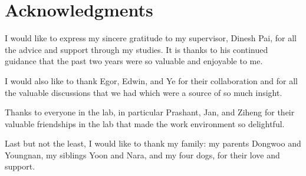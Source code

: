 
\chapter{Acknowledgments}

I would like to express my sincere gratitude to my supervisor, Dinesh Pai, for all the advice and support through my studies.
It is thanks to his continued guidance that the past two years were so valuable and enjoyable to me.

I would also like to thank Egor, Edwin, and Ye for their collaboration and for all the valuable discussions that we had which were a source of so much insight.

Thanks to everyone in the lab, in particular Prashant, Jan, and Ziheng for their valuable friendships in the lab that made the work environment so delightful.

Last but not the least, I would like to thank my family: my parents Dongwoo and Youngnan, my siblings Yoon and Nara, and my four dogs, for their love and support.